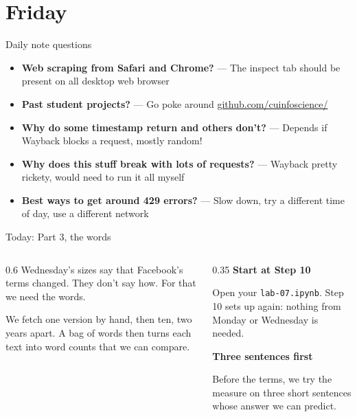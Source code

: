 \documentclass[9pt,aspectratio=169]{beamer}
\begin{document}
\section{Friday}

\begin{frame}{Daily note questions}
    \begin{itemize}\small
        \item \textbf{Web scraping from Safari and Chrome?} --- The inspect tab should be present on all desktop web browser
        \item \textbf{Past student projects?} --- Go poke around \url{github.com/cuinfoscience/}
        \item \textbf{Why do some timestamp return and others don't?} --- Depends if Wayback blocks a request, mostly random!
        \item \textbf{Why does this stuff break with lots of requests?} --- Wayback pretty rickety, would need to run it all myself
        \item  \textbf{Best ways to get around 429 errors?} --- Slow down, try a different time of day, use a different network
    \end{itemize}
\end{frame}

\begin{frame}{Today: Part 3, the words}
    \begin{columns}[T]
        \begin{column}{0.6\textwidth}
            Wednesday's sizes say that Facebook's terms changed. They don't say how. For that we need the words.

            \medskip
            We fetch one version by hand, then ten, two years apart. A bag of words then turns each text into word counts that we can compare.
        \end{column}
        \begin{column}{0.35\textwidth}
            \textbf{Start at Step 10}\\[2pt]
            {\footnotesize Open your \texttt{lab-07.ipynb}. Step 10 sets up again: nothing from Monday or Wednesday is needed.\par}
            \medskip
            \textbf{Three sentences first}\\[2pt]
            {\footnotesize Before the terms, we try the measure on three short sentences whose answer we can predict.\par}
        \end{column}
    \end{columns}
\end{frame}
\end{document}
